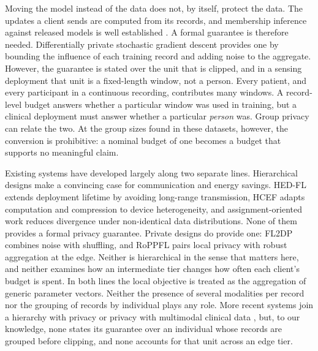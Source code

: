 Moving the model instead of the data does not, by itself, protect the data.
The updates a client sends are computed from its records, and membership
inference against released models is well established \cite{ref14}. A formal
guarantee is therefore needed. Differentially private stochastic gradient
descent \cite{ref6} provides one by bounding the influence of each training
record and adding noise to the aggregate. However, the guarantee is stated over
the unit that is clipped, and in a sensing deployment that unit is a
fixed-length window, not a person. Every patient, and every participant in a
continuous recording, contributes many windows. A record-level budget answers
whether a particular window was used in training, but a clinical deployment
must answer whether a particular \emph{person} was. Group privacy \cite{ref8}
can relate the two. At the group sizes found in these datasets, however, the
conversion is prohibitive: a nominal budget of one becomes a budget that
supports no meaningful claim.

Existing systems have developed largely along two separate lines. Hierarchical designs
make a convincing case for communication and energy savings. HED-FL
\cite{ref3} extends deployment lifetime by avoiding long-range transmission,
HCEF \cite{ref4} adapts computation and compression to device heterogeneity,
and assignment-oriented work \cite{ref5} reduces divergence under non-identical
data distributions. None of them provides a formal privacy guarantee. Private
designs do provide one: FL2DP \cite{ref9} combines noise with shuffling, and
RoPPFL \cite{ref10} pairs local privacy with robust aggregation at the edge.
Neither is hierarchical in the sense that matters here, and neither examines
how an intermediate tier changes how often each client's budget is spent. In
both lines the local objective is treated as the aggregation of generic
parameter vectors. Neither the presence of several modalities per record nor
the grouping of records by individual plays any role. More recent systems
join a hierarchy with privacy \cite{ref34, ref37} or privacy with multimodal
clinical data \cite{ref35, ref36}, but, to our knowledge, none states its
guarantee over an individual whose records are grouped before clipping, and
none accounts for that unit across an edge tier.

